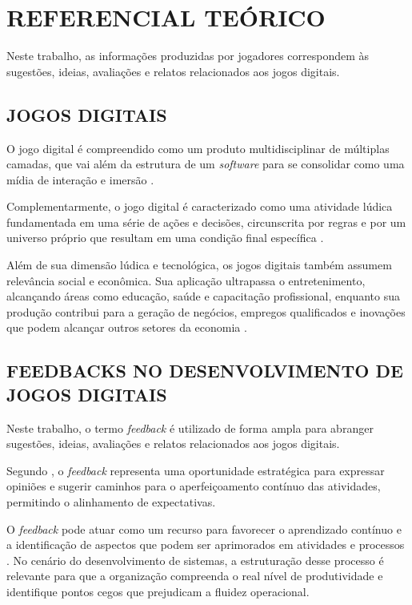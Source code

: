 \chapter{REFERENCIAL TEÓRICO} \label{cha:Referencial teórico}

Neste trabalho, as informações produzidas por jogadores correspondem às sugestões, ideias, avaliações e relatos relacionados aos jogos digitais.

\section{JOGOS DIGITAIS}
O jogo digital é compreendido como um produto multidisciplinar de múltiplas camadas, que vai além da estrutura de um \textit{software} para se consolidar como uma mídia de interação e imersão \cite{silva2022elementos}.

Complementarmente, o jogo digital é caracterizado como uma atividade lúdica fundamentada em uma série de ações e decisões, circunscrita por regras e por um universo próprio que resultam em uma condição final específica \cite{alves2020jogos}. 

Além de sua dimensão lúdica e tecnológica, os jogos digitais também assumem relevância social e econômica. Sua aplicação ultrapassa o entretenimento, alcançando áreas como educação, saúde e capacitação profissional, enquanto sua produção contribui para a geração de negócios, empregos qualificados e inovações que podem alcançar outros setores da economia \cite{fortim2022pesquisa}.

\section{FEEDBACKS NO DESENVOLVIMENTO DE JOGOS DIGITAIS}

Neste trabalho, o termo \textit{feedback} é utilizado de forma ampla para abranger sugestões, ideias, avaliações e relatos relacionados aos jogos digitais.

Segundo , o \textit{feedback} representa uma oportunidade estratégica para expressar opiniões e sugerir caminhos para o aperfeiçoamento contínuo das atividades, permitindo o alinhamento de expectativas. 

O \textit{feedback} pode atuar como um recurso para favorecer o aprendizado contínuo e a identificação de aspectos que podem ser aprimorados em atividades e processos \cite{aquino2023feedback}. No cenário do desenvolvimento de sistemas, a estruturação desse processo é relevante para que a organização compreenda o real nível de produtividade e identifique pontos cegos que prejudicam a fluidez operacional.

